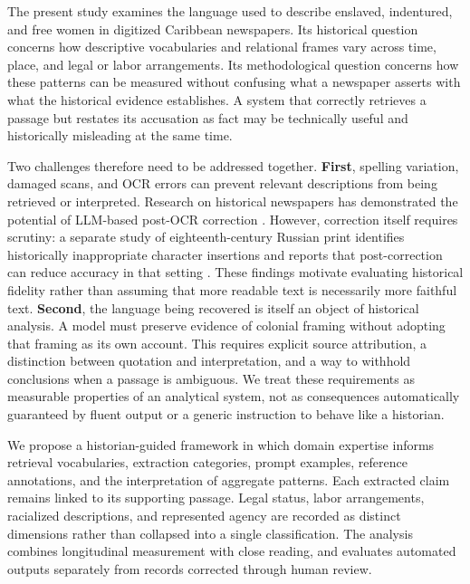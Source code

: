 \documentclass[sigconf]{acmart}
\begin{document}
The present study examines the language used to describe enslaved, indentured, and free women in digitized Caribbean newspapers. Its historical question concerns how descriptive vocabularies and relational frames vary across time, place, and legal or labor arrangements. Its methodological question concerns how these patterns can be measured without confusing what a newspaper asserts with what the historical evidence establishes. A system that correctly retrieves a passage but restates its accusation as fact may be technically useful and historically misleading at the same time.

Two challenges therefore need to be addressed together. \textbf{First}, spelling variation, damaged scans, and OCR errors can prevent relevant descriptions from being retrieved or interpreted. Research on historical newspapers has demonstrated the potential of LLM-based post-OCR correction \citep{thomas2024leveraging}. However, correction itself requires scrutiny: a separate study of eighteenth-century Russian print identifies historically inappropriate character insertions and reports that post-correction can reduce accuracy in that setting \citep{levchenko2025evaluating}. These findings motivate evaluating historical fidelity rather than assuming that more readable text is necessarily more faithful text. \textbf{Second}, the language being recovered is itself an object of historical analysis. A model must preserve evidence of colonial framing without adopting that framing as its own account. This requires explicit source attribution, a distinction between quotation and interpretation, and a way to withhold conclusions when a passage is ambiguous. We treat these requirements as measurable properties of an analytical system, not as consequences automatically guaranteed by fluent output or a generic instruction to behave like a historian.

We propose a historian-guided framework in which domain expertise informs retrieval vocabularies, extraction categories, prompt examples, reference annotations, and the interpretation of aggregate patterns. Each extracted claim remains linked to its supporting passage. Legal status, labor arrangements, racialized descriptions, and represented agency are recorded as distinct dimensions rather than collapsed into a single classification. The analysis combines longitudinal measurement with close reading, and evaluates automated outputs separately from records corrected through human review.
\end{document}
